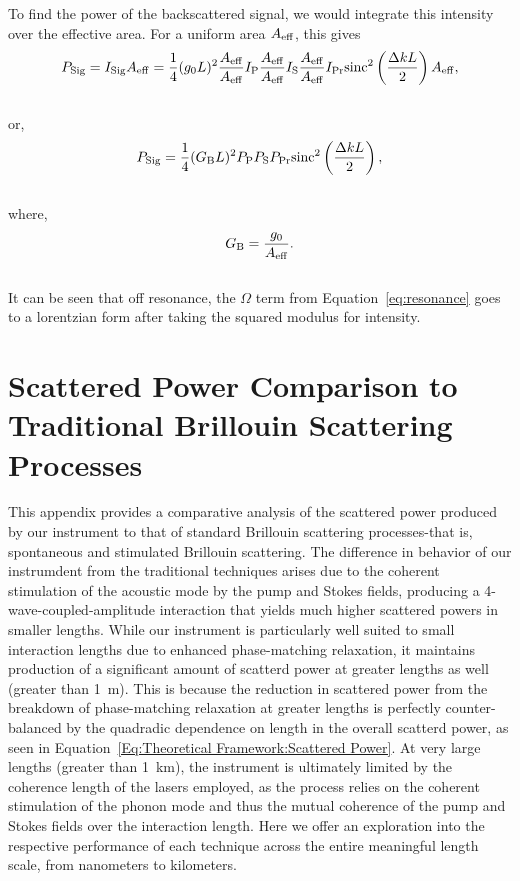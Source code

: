To find the power of the backscattered signal, we would integrate this intensity over the effective area. For a uniform area \(A_{\rm eff}\), this gives
\\
\begin{equation}
  P_{\rm Sig} = I_{\rm Sig}A_{\rm eff} = \frac{1}{4}(g_{0}L)^{2}\frac{A_{\rm eff}}{A_{\rm eff}}I_{\rm P}\frac{A_{\rm eff}}{A_{\rm eff}}I_{\rm S}\frac{A_{\rm eff}}{A_{\rm eff}}I_{\rm Pr}\mathrm{sinc}^{2}\left(\frac{\Delta kL}{2}\right)A_{\rm eff},
\end{equation}
\\
or,
\\
\begin{equation}
  P_{\rm Sig} = \frac{1}{4}(G_{\rm B}L)^{2}P_{\rm P}P_{\rm S}P_{\rm Pr}\mathrm{sinc}^{2}\left(\frac{\Delta kL}{2}\right),
\end{equation}
\\
where,
\\
\begin{equation}
  G_{\rm B} = \frac{g_{0}}{A_{\rm eff}}.
\end{equation}
\\
It can be seen that off resonance, the \(\Omega\) term from Equation~\ref{eq:resonance} goes to a lorentzian form after taking the squared modulus for intensity.

\newpage


\section{Scattered Power Comparison to Traditional Brillouin Scattering Processes}
\label{appendix:comparison}

This appendix provides a comparative analysis of the scattered power produced by our instrument to that of standard Brillouin scattering processes-that is, spontaneous and stimulated Brillouin scattering. The difference in behavior of our instrumdent from the traditional techniques arises due to the coherent stimulation of the acoustic mode by the pump and Stokes fields, producing a 4-wave-coupled-amplitude interaction that yields much higher scattered powers in smaller lengths. While our instrument is particularly well suited to small interaction lengths due to enhanced phase-matching relaxation, it maintains production of a significant amount of scatterd power at greater lengths as well (greater than \SI{1}{\meter}). This is because the reduction in scattered power from the breakdown of phase-matching relaxation at greater lengths is perfectly counter-balanced by the quadradic dependence on length in the overall scatterd power, as seen in Equation~\ref{Eq:Theoretical Framework:Scattered Power}. At very large lengths (greater than \SI{1}{\kilo\meter}), the instrument is ultimately limited by the coherence length of the lasers employed, as the process relies on the coherent stimulation of the phonon mode and thus the mutual coherence of the pump and Stokes fields over the interaction length. Here we offer an exploration into the respective performance of each technique across the entire meaningful length scale, from nanometers to kilometers.

